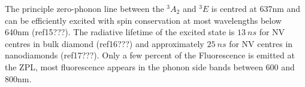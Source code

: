 \documentclass[prl]{revtex4}
\begin{document}
 
The principle zero-phonon line between the $^3A_2$ and $^3E$ is centred at 637nm and can be efficiently excited with spin conservation at most wavelengths below 640nm (ref15???). The radiative lifetime of the excited state is $\SI{13}{ns}$ for NV centres in bulk diamond (ref16???) and approximately $\SI{25}{ns}$ for NV centres in nanodiamonds (ref17???). Only a few percent of the Fluorescence is emitted at the ZPL, most fluorescence appears in the phonon side bands between 600 and 800nm.
\end{document}
